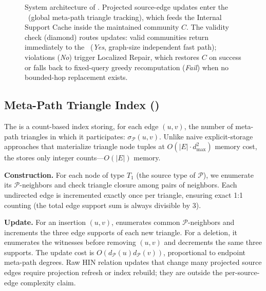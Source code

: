 \begin{figure}[htbp]
{}
\caption{System architecture of \DynaSCSH. Projected source-edge updates enter the \mtindex\ (global meta-path triangle tracking), which feeds the Internal Support Cache inside the maintained community $C$. The validity check (diamond) routes updates: valid communities return immediately to the \mtindex\ (\emph{Yes}, graph-size independent fast path); violations (\emph{No}) trigger Localized Repair, which restores $C$ on success or falls back to fixed-query greedy recomputation (\emph{Fail}) when no bounded-hop replacement exists.}
\label{fig:architecture}
\end{figure}

\subsection[Meta-Path Triangle Index]{Meta-Path Triangle Index (\mtindex)}

The \mtindex is a count-based index storing, for each edge $(u,v)$, the number of meta-path triangles in which it participates: $\sigma_{\mathcal{P}}(u,v)$. Unlike naive explicit-storage approaches that materialize triangle node tuples at $O(|E|\cdot d_{\max}^2)$ memory cost, the \mtindex stores only integer counts---$O(|E|)$ memory.

\textbf{Construction.} For each node of type $T_1$ (the source type of $\mathcal{P}$), we enumerate its $\mathcal{P}$-neighbors and check triangle closure among pairs of neighbors. Each undirected edge is incremented exactly once per triangle, ensuring exact 1:1 counting (the total edge support sum is always divisible by 3).

\textbf{Update.} For an insertion $(u,v)$, \mtindex enumerates common $\mathcal{P}$-neighbors and increments the three edge supports of each new triangle. For a deletion, it enumerates the witnesses before removing $(u,v)$ and decrements the same three supports. The update cost is $O(d_{\mathcal{P}}(u)d_{\mathcal{P}}(v))$, proportional to endpoint meta-path degrees. Raw HIN relation updates that change many projected source edges require projection refresh or index rebuild; they are outside the per-source-edge complexity claim.

